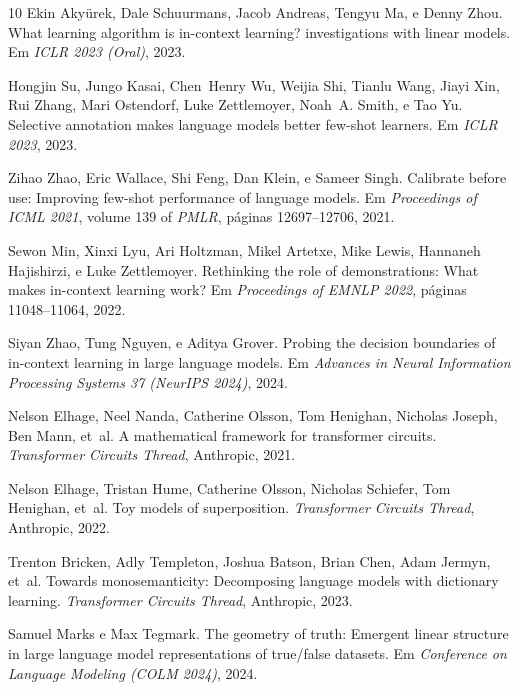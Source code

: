 \documentclass[12pt,a4paper]{article}
\begin{document}
\begin{thebibliography}{10}
Ekin Akyürek, Dale Schuurmans, Jacob Andreas, Tengyu Ma, e Denny Zhou.
\newblock What learning algorithm is in-context learning? investigations with
  linear models.
\newblock Em \emph{ICLR 2023 (Oral)}, 2023.

Hongjin Su, Jungo Kasai, Chen~Henry Wu, Weijia Shi, Tianlu Wang, Jiayi Xin,
  Rui Zhang, Mari Ostendorf, Luke Zettlemoyer, Noah~A. Smith, e Tao Yu.
\newblock Selective annotation makes language models better few-shot learners.
\newblock Em \emph{ICLR 2023}, 2023.

Zihao Zhao, Eric Wallace, Shi Feng, Dan Klein, e Sameer Singh.
\newblock Calibrate before use: Improving few-shot performance of language
  models.
\newblock Em \emph{Proceedings of ICML 2021}, volume 139 of \emph{PMLR},
  páginas 12697--12706, 2021.

Sewon Min, Xinxi Lyu, Ari Holtzman, Mikel Artetxe, Mike Lewis, Hannaneh
  Hajishirzi, e Luke Zettlemoyer.
\newblock Rethinking the role of demonstrations: What makes in-context learning
  work?
\newblock Em \emph{Proceedings of EMNLP 2022}, páginas 11048--11064, 2022.

Siyan Zhao, Tung Nguyen, e Aditya Grover.
\newblock Probing the decision boundaries of in-context learning in large
  language models.
\newblock Em \emph{Advances in Neural Information Processing Systems 37
  (NeurIPS 2024)}, 2024.

Nelson Elhage, Neel Nanda, Catherine Olsson, Tom Henighan, Nicholas Joseph,
  Ben Mann, et~al.
\newblock A mathematical framework for transformer circuits.
\newblock \emph{Transformer Circuits Thread}, Anthropic, 2021.

Nelson Elhage, Tristan Hume, Catherine Olsson, Nicholas Schiefer, Tom
  Henighan, et~al.
\newblock Toy models of superposition.
\newblock \emph{Transformer Circuits Thread}, Anthropic, 2022.

Trenton Bricken, Adly Templeton, Joshua Batson, Brian Chen, Adam Jermyn,
  et~al.
\newblock Towards monosemanticity: Decomposing language models with
  dictionary learning.
\newblock \emph{Transformer Circuits Thread}, Anthropic, 2023.

Samuel Marks e Max Tegmark.
\newblock The geometry of truth: Emergent linear structure in large language
  model representations of true/false datasets.
\newblock Em \emph{Conference on Language Modeling (COLM 2024)}, 2024.


\end{thebibliography}
\end{document}
